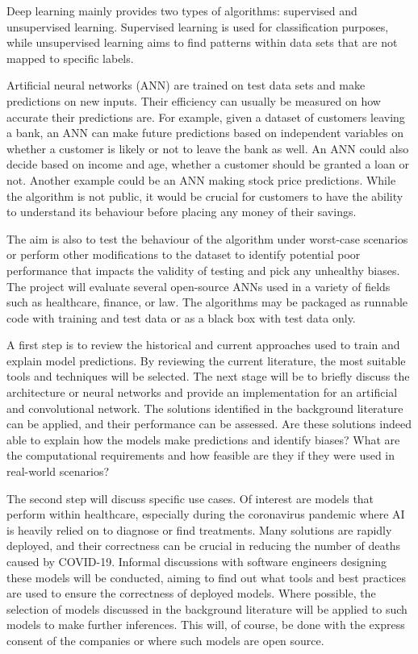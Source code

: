 \documentclass[proposal]{softeng}
\begin{document}
    Deep learning mainly provides two types of algorithms: supervised and unsupervised learning. Supervised learning is used for classification purposes, while unsupervised learning aims to find patterns within data sets that are not mapped to specific labels.

    Artificial neural networks (ANN) are trained on test data sets and make predictions on new inputs. Their efficiency can usually be measured on how accurate their predictions are. For example, given a dataset of customers leaving a bank, an ANN can make future predictions based on independent variables on whether a customer is likely or not to leave the bank as well. An ANN could also decide based on income and age, whether a customer should be granted a loan or not. Another example could be an ANN making stock price predictions. While the algorithm is not public, it would be crucial for customers to have the ability to understand its behaviour before placing any money of their savings.

    The aim is also to test the behaviour of the algorithm under worst-case scenarios or perform other modifications to the dataset to identify potential poor performance that impacts the validity of testing and pick any unhealthy biases. The project will evaluate several open-source ANNs used in a variety of fields such as healthcare, finance, or law. The algorithms may be packaged as runnable code with training and test data or as a black box with test data only.

    A first step is to review the historical and current approaches used to train and explain model predictions. By reviewing the current literature, the most suitable tools and techniques will be selected. The next stage will be to briefly discuss the architecture or neural networks and provide an implementation for an artificial and convolutional network. The solutions identified in the background literature can be applied, and their performance can be assessed. Are these solutions indeed able to explain how the models make predictions and identify biases? What are the computational requirements and how feasible are they if they were used in real-world scenarios?

    The second step will discuss specific use cases. Of interest are models that perform within healthcare, especially during the coronavirus pandemic where AI is heavily relied on to diagnose or find treatments. Many solutions are rapidly deployed, and their correctness can be crucial in reducing the number of deaths caused by COVID-19. Informal discussions with software engineers designing these models will be conducted, aiming to find out what tools and best practices are used to ensure the correctness of deployed models. Where possible, the selection of models discussed in the background literature will be applied to such models to make further inferences. This will, of course, be done with the express consent of the companies or where such models are open source.
\end{document}
